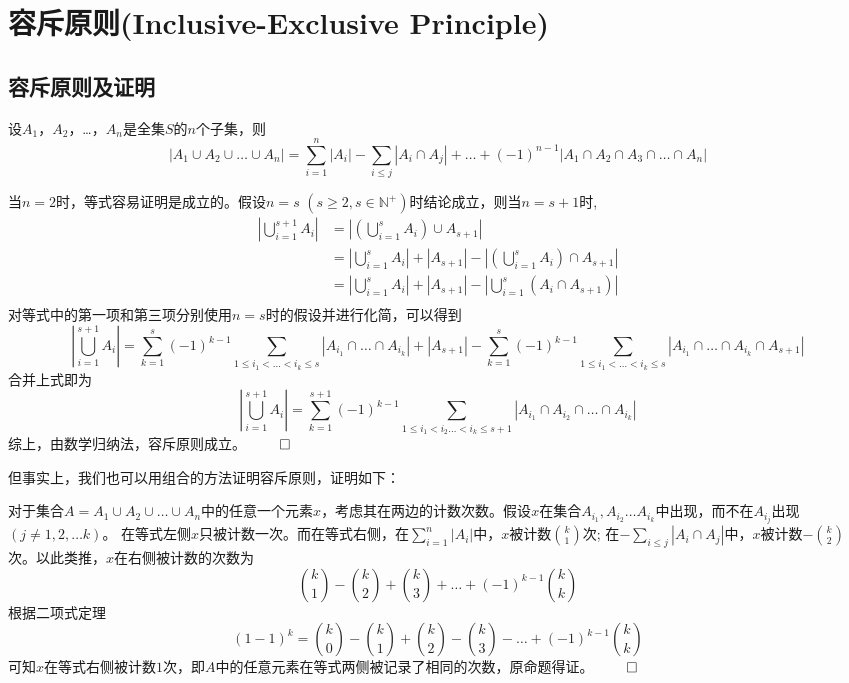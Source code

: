 ﻿\documentclass[11pt]{article}
\renewenvironment{proof}{{\noindent\hskip 2em \bf 证明 \quad}}{\hfill$\qed$\par}
\newenvironment{concept}[1]{{\bf #1\quad} \begin{kaishu}} {\end{kaishu}\par}
\begin{document}
    \section{容斥原则(Inclusive-Exclusive Principle)}

    \subsection{容斥原则及证明}
    \begin{concept}{容斥原则}
       设$A_1$，$A_2$，\dots，$A_n$是全集$S$的$n$个子集，则
       \[
       |A_1 \cup A_2 \cup \dots \cup A_n|=\sum \limits _{i=1}^n|A_i|-\sum_{i \le j}|A_i \cap A_j|+ \dots + (-1)^{n-1}|A_1 \cap A_2 \cap A_3 \cap \dots \cap A_n|
         \]
    \end{concept}
    \begin{proof}{(数学归纳法)}
        当$n=2$时，等式容易证明是成立的。假设$n=s$ $(s \geq 2,s \in \mathbb N^+ )$时结论成立，则当$n=s+1$时,
        \begin{align*}
           |\bigcup \limits_{i=1}^{s+1}A_i|&=|(\bigcup \limits_{i=1}^s A_i)\cup A_{s+1}|\\
           &=|\bigcup \limits_{i=1}^{s}A_i|+|A_{s+1}|-|(\bigcup \limits_{i=1}^s A_i)\cap A_{s+1}|\\
           &=|\bigcup \limits_{i=1}^{s}A_i|+|A_{s+1}|-|\bigcup \limits_{i=1}^s (A_i \cap A_{s+1})|\\
        \end{align*}
        对等式中的第一项和第三项分别使用$n=s$时的假设并进行化简，可以得到
        \[
            |\bigcup_{i=1}^{s+1}A_i|=\sum_{k=1}^s(-1)^{k-1}\sum_{1\leq i_1<\ldots< i_k\leq s}|A_{i_1}\cap \ldots \cap A_{i_k}|+|A_{s+1}|-
            \sum_{k=1}^s(-1)^{k-1}\sum_{1\leq i_1<\ldots< i_k\leq s}|A_{i_1}\cap \ldots \cap A_{i_k}\cap A_{s+1}|
        \]
        合并上式即为
        \[
            |\bigcup \limits_{i=1}^{s+1}A_i|= \sum \limits _{k=1}^{s+1}(-1)^{k-1} \sum_{1\leq i_1 < i_2 \dots < i_{k}\leq s+1}|A_{i_1} \cap A_{i_2} \cap \dots \cap A_{i_k}|
        \]
        综上，由数学归纳法，容斥原则成立。
    \end{proof}

    但事实上，我们也可以用组合的方法证明容斥原则，证明如下：

    \begin{proof}{(组合方法)}
        对于集合$A=A_1 \cup A_2 \cup \dots \cup A_n$中的任意一个元素$x$，考虑其在两边的计数次数。假设$x$在集合$A_{i_1},A_{i_2} \dots A_{i_k}$中出现，而不在$A_{i_j}$出现$(j \neq 1,2,\dots k)$。 在等式左侧$x$只被计数一次。而在等式右侧，在$\sum \nolimits _{i=1}^n|A_i|$中，$x$被计数$k \choose 1$次; 在$-\sum_{i\le j}|A_i \cap A_j|$中，$x$被计数$- {k \choose 2}$ 次。以此类推，$x$在右侧被计数的次数为
        \[
            {k \choose 1} - {k \choose 2} + {k \choose 3} + \dots + (-1)^{k-1} {k \choose k}
        \]
        根据二项式定理
        \[
            (1-1)^k={k \choose 0} - {k \choose 1} + {k \choose 2} - {k \choose 3} - \dots + (-1)^{k-1} {k \choose k}
        \]
        可知$x$在等式右侧被计数$1$次，即$A$中的任意元素在等式两侧被记录了相同的次数，原命题得证。
    \end{proof}
\end{document}
